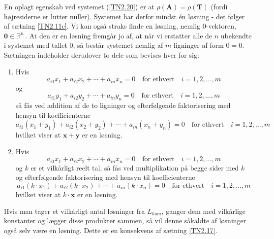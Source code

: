 \begin{bevis}
En oplagt egenskab ved systemet (\ref{TN2.20}) er at $\rho(\mathbf A)= \rho(\mathbf T)$ (fordi højresiderne er lutter nuller). Systemet har derfor mindst én løsning - det følger af sætning \ref{TN2.11c}. Vi kan også straks finde en løsning, nemlig $0$-vektoren, $\mathbf 0 \in \mathbb R^n\,$. At den er en løsning fremgår jo af, at når vi erstatter alle de $n$ ubekendte i systemet med tallet $0$, så består systemet nemlig af $m$ ligninger af form $0=0$.\bs
Sætningen indeholder derudover to dele som bevises hver for sig:
\begin{enumerate}
\item
Hvis
\begin{equation}
a_{i1}x_1+a_{i2}x_2+\cdots + a_{in}x_n=0 \quad \textrm{for ethvert} \quad i=1,2,\ldots , m
\end{equation}
og
\begin{equation}
a_{i1}y_1+a_{i2}y_2+\cdots + a_{in}y_n=0 \quad \textrm{for ethvert} \quad i=1,2,\ldots , m
\end{equation}
så fås ved addition af de to ligninger og efterfølgende faktorisering med hensyn til koefficienterne
\begin{equation}
a_{i1}(x_1+y_1) + a_{i2}(x_2+y_2) + \cdots + a_{in}(x_n+y_n)=0 \quad \textrm{for ethvert} \quad i=1,2,\ldots , m
\end{equation}
hvilket viser at $\mathbf x + \mathbf y$ er en løsning.
\item
Hvis
\begin{equation}
a_{i1}x_1+a_{i2}x_2+\cdots + a_{in}x_n=0 \quad \textrm{for ethvert} \quad i=1,2,\ldots , m
\end{equation}
og $k$ er et vilkårligt reelt tal, så fås ved multiplikation på begge sider med $k$ og efterfølgende faktorisering med hensyn til koefficienterne
\begin{equation}
a_{i1}(k \cdot x_1)+a_{i2}(k \cdot x_2)+\cdots + a_{in}(k\cdot x_n)=0\quad \textrm{for ethvert}\quad i=1,2,\ldots,m
\end{equation}
hvilket viser at $k\cdot \mathbf x$ er en løsning.
\end{enumerate}
\end{bevis}

\begin{remark}
Hvis man tager et vilkårligt antal løsninger fra $L_{hom}$, ganger dem med vilkårlige konstanter og lægger disse produkter sammen, så vil denne såkaldte  af løsninger også selv være en løsning. Dette er en konsekvens af sætning \ref{TN2.17}. 
\end{remark}


